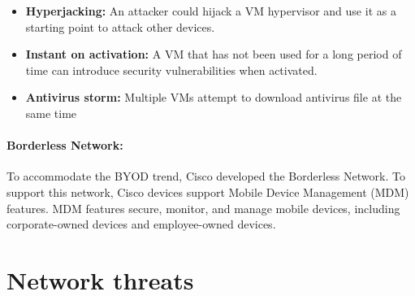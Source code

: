 \begin{itemize}
\item \textbf{Hyperjacking:} An attacker could hijack a VM hypervisor and use it as a starting point to attack other devices.
\item \textbf{Instant on activation:} A VM that has not been used for a long period of time can introduce security vulnerabilities when activated.
\item \textbf{Antivirus storm:} Multiple VMs attempt to download antivirus file at the same time
\end{itemize}

\paragraph{Borderless Network:} To accommodate the BYOD trend, Cisco developed the Borderless Network. To support this network, Cisco devices support Mobile Device Management (MDM) features. MDM features secure, monitor, and manage mobile devices, including corporate-owned devices and employee-owned devices. 
%

\section{Network threats}


